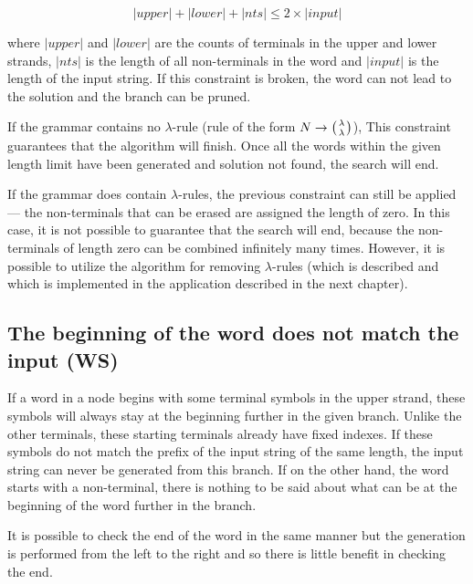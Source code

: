 $$|upper| + |lower| + |nts| \leq 2 \times |input|$$

where $|upper|$ and $|lower|$ are the counts of terminals in the upper and lower strands, $|nts|$ is the length of all non-terminals in the word and $|input|$ is the length of the input string. If this constraint is broken, the word can not lead to the solution and the branch can be pruned.


If the grammar contains no $\lambda$-rule (rule of the form $N \rightarrow \wkpair{\lambda}{\lambda}$), This constraint guarantees that the algorithm will finish. Once all the words within the given length limit have been generated and solution not found, the search will end.

If the grammar does contain $\lambda$-rules, the previous constraint can still be applied --- the non-terminals that can be erased are assigned the length of zero. In this case, it is not possible to guarantee that the search will end, because the non-terminals of length zero can be combined infinitely many times. However, it is possible to utilize the algorithm for removing $\lambda$-rules (which is described \cite{WK_CYK} and which is implemented in the application described in the next chapter).

\subsection{The beginning of the word does not match the input (WS)}
If a word in a node begins with some terminal symbols in the upper strand, these symbols will always stay at the beginning further in the given branch. Unlike the other terminals, these starting terminals already have fixed indexes. If these symbols do not match the prefix of the input string of the same length, the input string can never be generated from this branch.
If on the other hand, the word starts with a non-terminal, there is nothing to be said about what can be at the beginning of the word further in the branch.

It is possible to check the end of the word in the same manner but the generation is performed from the left to the right and so there is little benefit in checking the end.

